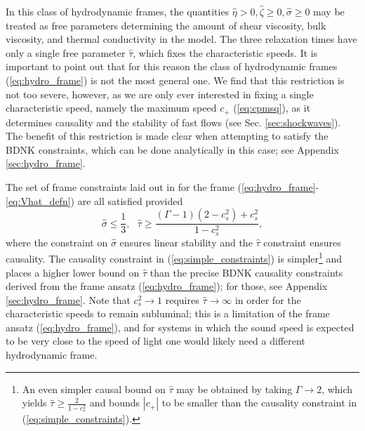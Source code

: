 \documentclass[%
notitlepage,
superscriptaddress,
nofootinbib,
amsmath,
amssymb,
aps,
twocolumn
]{revtex4-1}
\begin{document}
In this class of hydrodynamic frames, the quantities $\hat{\eta} > 0,
\hat{\zeta} \geq 0, \hat{\sigma} \geq 0$ may be treated as free parameters
determining the amount of shear viscosity, bulk viscosity, and thermal
conductivity in the model.  The three relaxation times have only a
single free parameter $\hat{\tau}$, which 
fixes the characteristic speeds. It is important to point out that for
this reason the class of hydrodynamic frames (\ref{eq:hydro_frame}) is
not the most general one.  We find that this restriction is not too
severe, however, as we are only ever interested in fixing a single
characteristic speed, namely the maximum speed $c_+$ (\ref{eq:cpmsq}), as
it determines causality and the stability of fast flows (see Sec.
\ref{sec:shockwaves}).  The benefit of this restriction is made clear
when attempting to satisfy the BDNK constraints, which can be done
analytically in this case; see Appendix \ref{sec:hydro_frame}.

The set of frame constraints laid out in \cite{Bemfica:2020zjp} for the frame (\ref{eq:hydro_frame}-\ref{eq:Vhat_defn}) are all satisfied provided
\begin{equation} \label{eq:simple_constraints}
\hat{\sigma} \leq \frac{1}{3}, ~~~ \hat{\tau} \geq \frac{(\Gamma - 1)(2 - c_s^2) + c_s^2}{1 - c_s^2},
\end{equation}
where the constraint on $\hat{\sigma}$ ensures linear stability and the
$\hat{\tau}$ constraint ensures causality. The causality constraint in
(\ref{eq:simple_constraints}) is simpler\footnote{An even simpler 
  causal bound on $\hat{\tau}$ may be obtained by taking $\Gamma
  \to 2$, which yields $\hat{\tau} \geq \frac{2}{1 - c_s^2}$ and bounds $|c_+|$ to be smaller than the causality constraint in (\ref{eq:simple_constraints}).} 
and places a higher lower bound on $\hat{\tau}$ than the precise BDNK causality constraints derived from the frame ansatz (\ref{eq:hydro_frame}); for those, see Appendix \ref{sec:hydro_frame}.
Note that $c_s^2 \to 1$ requires $\hat{\tau} \to \infty$ in order for the characteristic speeds to remain subluminal; this is a limitation of the frame ansatz (\ref{eq:hydro_frame}), and for systems in which the sound speed is expected to be very close to the speed of light one would likely need a different hydrodynamic frame.
\end{document}
